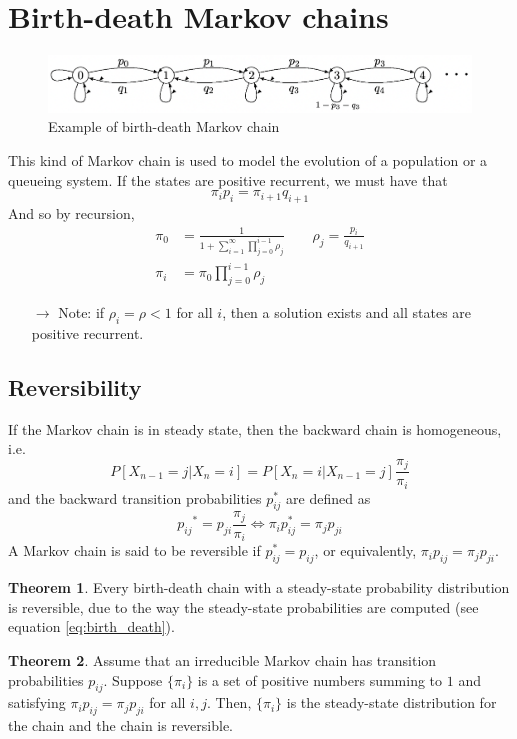 \documentclass[12pt, openany]{report}
\theoremstyle{definition}
\newtheorem{thm}{Theorem}[chapter]
\begin{document}
\section{Birth-death Markov chains}\label{sec:birth_death}
\begin{figure}[H]
	\centering
	\includegraphics[width=.8\textwidth]{img/bd_markov_chain.png}
	\caption{Example of birth-death Markov chain}
	\label{fig:birth_death}
\end{figure}
This kind of Markov chain is used to model the evolution of a population or a queueing system. If the states are positive recurrent, we must have that 
\begin{equation}\label{eq:birth_death}
	\pi_i p_i = \pi_{i+1}q_{i+1}
\end{equation}
And so by recursion, 
\begin{equation}
	\begin{aligned}
		\pi_0 &= \frac{1}{1+\sum_{i=1}^\infty \prod_{j=0}^{i-1}\rho_j}\qquad \rho_j = \frac{p_i}{q_{i+1}}\\
		\pi_i &= \pi_0 \prod_{j=0}^{i-1}\rho_j
	\end{aligned}
\end{equation}
\begin{itemize}
	\item [$\to$] Note: if $\rho_i=\rho<1$ for all $i$, then a solution exists and all states are positive recurrent.
\end{itemize}
\subsection{Reversibility}
If the Markov chain is in steady state, then the backward chain is homogeneous, i.e.
\begin{equation}
	P[X_{n-1} = j|X_n=i] = P[X_{n} = i|X_{n-1}=j]\frac{\pi_j}{\pi_i}
\end{equation}
and the backward transition probabilities $p_{ij}^*$ are defined as 
\begin{equation}
	p_{ij}{^*} = p_{ji}\frac{\pi_j}{\pi_i} \Longleftrightarrow \pi_i p_{ij}^* = \pi_j p_{ji}
\end{equation}
A Markov chain is said to be reversible if $p_{ij}^* = p_{ij}$, or equivalently, $\pi_i p_{ij} = \pi_j p_{ji}$.
\begin{thm}
	Every birth-death chain with a steady-state probability distribution is reversible, due to the way the steady-state probabilities are computed (see equation \eqref{eq:birth_death}).
\end{thm}
\begin{thm}
	Assume that an irreducible Markov chain has transition probabilities $p_{ij}$. Suppose $\{\pi_i\}$ is a set of positive numbers summing to $1$ and satisfying $\pi_i p_{ij}= \pi_j p_{ji}$ for all $i,j$. Then, $\{\pi_i\}$ is the steady-state distribution for the chain and the chain is reversible. 
\end{thm}
\end{document}
